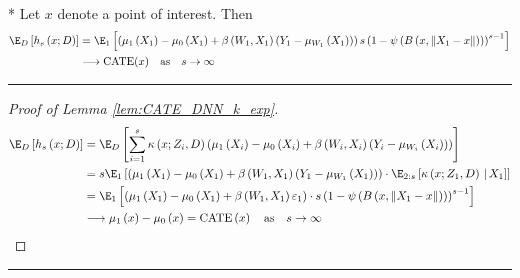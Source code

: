 \begin{lem}\label{lem:CATE_DNN_k_exp}\mbox{}\\*
	Let $x$ denote a point of interest.
	Then
	\begin{equation}
		\begin{aligned}
			\E_D\left[h_s\left(x; D\right)\right]
			& = \E_{1}\left[\left(\mu_{1}\left(X_1\right) - \mu_{0}\left(X_1\right) + \beta\left(W_{1}, X_1\right)\left(Y_{1} - \mu_{W_{1}}\left(X_1\right)\right)\right)
			s\left(1 - \psi\left(B\left(x, \|X_1 - x\|\right)\right)\right)^{s-1}\right]\\
			& \longrightarrow \operatorname{CATE}(x) \quad \text{as} \quad s \rightarrow \infty
		\end{aligned}
	\end{equation}
\end{lem}
\hrule
\begin{proof}[Proof of Lemma \ref{lem:CATE_DNN_k_exp}]
	\begin{equation}
		\begin{aligned}
			\E_D\left[h_s\left(x; D\right)\right]
			& = \E_D\left[\sum_{i = 1}^{s} \kappa\left(x; Z_{i}, D\right) \left(\mu_{1}\left(X_{i}\right) - \mu_{0}\left(X_{i}\right) + \beta\left(W_{i}, X_{i}\right)\left(Y_{i} - \mu_{W_{i}}\left(X_{i}\right)\right)\right)\right]\\
			& = s \E_{1}\left[\left(\mu_{1}\left(X_1\right) - \mu_{0}\left(X_1\right) + \beta\left(W_{1}, X_1\right)\left(Y_{1} - \mu_{W_{1}}\left(X_1\right)\right)\right)
			\cdot \E_{2:s}\left[\kappa\left(x; Z_1, D\right)\, | \, X_1 \right]\right]\\
			& = \E_{1}\left[\left(\mu_{1}\left(X_1\right) - \mu_{0}\left(X_1\right) + \beta\left(W_{1}, X_1\right)\varepsilon_1\right)
			\cdot s\left(1 - \psi\left(B\left(x, \|X_1 - x\|\right)\right)\right)^{s-1}\right]\\
			& \longrightarrow \mu_{1}\left(x\right) - \mu_{0}\left(x\right)
			= \operatorname{CATE}\left(x\right) 
			\quad \text{as} \quad s \rightarrow \infty
		\end{aligned}
	\end{equation}
\end{proof}

\hrule

